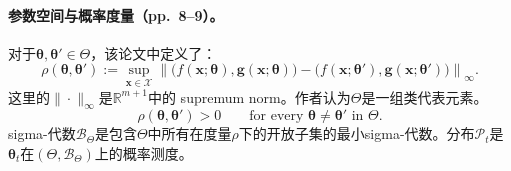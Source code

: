 \documentclass{article}
\begin{document}
\paragraph{参数空间与概率度量（pp.~8--9）。}
对于$\boldsymbol{\theta},\boldsymbol{\theta}'\in\Theta$，该论文中定义了：
\begin{equation}
\rho(\boldsymbol{\theta},\boldsymbol{\theta}')
:=\sup_{\boldsymbol{x}\in\mathcal{X}}
\left\|
\bigl(f(\boldsymbol{x};\boldsymbol{\theta}),\boldsymbol{g}(\boldsymbol{x};\boldsymbol{\theta})\bigr)
-
\bigl(f(\boldsymbol{x};\boldsymbol{\theta}'),\boldsymbol{g}(\boldsymbol{x};\boldsymbol{\theta}')\bigr)
\right\|_{\infty}.
\tag{2}
\end{equation}
这里的$\|\cdot\|_{\infty}$是$\mathbb{R}^{m+1}$中的 supremum norm。作者认为$\Theta$是一组类代表元素。
\[
\rho(\boldsymbol{\theta},\boldsymbol{\theta}')>0
\qquad\text{for every }\boldsymbol{\theta}\ne\boldsymbol{\theta}'\text{ in }\Theta.
\]
sigma-代数$\mathcal{B}_{\Theta}$是包含$\Theta$中所有在度量$\rho$下的开放子集的最小sigma-代数。分布$\mathcal{P}_t$是$\boldsymbol{\theta}_t$在$(\Theta,\mathcal{B}_{\Theta})$上的概率测度。
\end{document}
